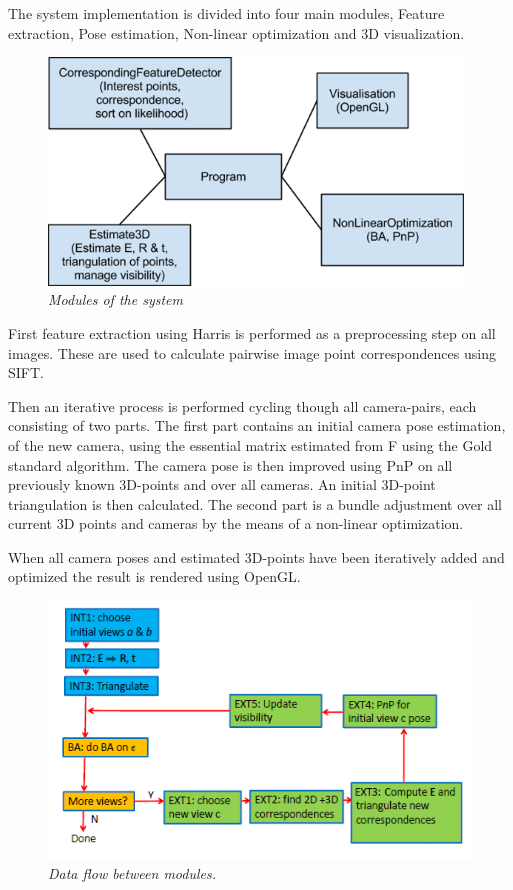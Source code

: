 The system implementation is divided into four main modules, Feature extraction, Pose estimation, Non-linear optimization and 3D visualization.

\begin{figure}[htb]
	\centering
	\includegraphics[width=110mm]{images/system_modules.png}
	\caption{\textit{Modules of the system}}
	\label{fig:block_overview2_fig}  %
\end{figure}

First feature extraction using Harris is performed as a preprocessing step on all images. These are used to calculate pairwise image point correspondences using SIFT.

Then an iterative process is performed cycling though all camera-pairs, each consisting of two parts. The first part contains an initial camera pose estimation, of the new camera, using the essential matrix estimated from F using the Gold standard algorithm. The camera pose is then improved using PnP on all previously known 3D-points and over all cameras. An initial 3D-point triangulation is then calculated.
The second part is a bundle adjustment over all current 3D points and cameras by the means of a non-linear optimization.

When all camera poses and estimated 3D-points have been iteratively added and optimized the result is rendered using OpenGL.

\begin{figure}[htb]
	\centering
	\includegraphics[width=120mm]{images/data_flow.png}
	\caption{\textit{Data flow between modules.}}
	\label{fig:block_overview_fig}  %
\end{figure}

